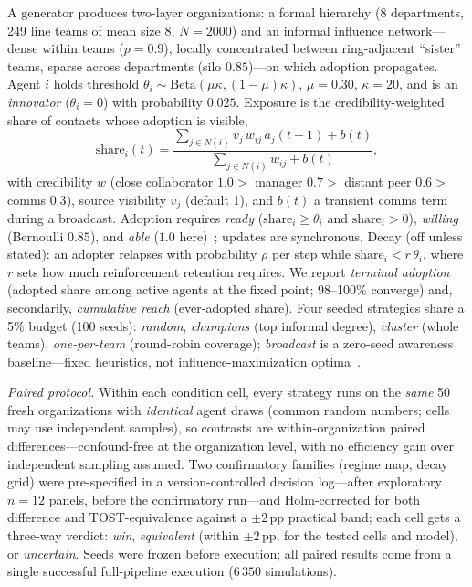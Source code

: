 \documentclass{llncs}
\begin{document}
A generator produces two-layer organizations: a formal hierarchy (8
departments, 249 line teams of mean size 8, $N{=}2000$) and an informal
influence network---dense within teams ($p{=}0.9$), locally concentrated
between ring-adjacent ``sister'' teams, sparse across departments (silo
$0.85$)---on which adoption propagates. Agent $i$ holds threshold
$\theta_i \sim \mathrm{Beta}(\mu\kappa,(1-\mu)\kappa)$, $\mu{=}0.30$,
$\kappa{=}20$, and is an \emph{innovator} ($\theta_i{=}0$) with probability
$0.025$. Exposure is the credibility-weighted share of contacts whose
adoption is visible,
\begin{equation}
\mathrm{share}_i(t) = \frac{\sum_{j\in N(i)} v_j\, w_{ij}\, a_j(t{-}1) + b(t)}
                           {\sum_{j\in N(i)} w_{ij} + b(t)},
\label{eq:share}
\end{equation}
with credibility $w$ (close collaborator $1.0>$ manager $0.7>$ distant peer
$0.6>$ comms $0.3$), source visibility $v_j$ (default 1), and $b(t)$ a
transient comms term during a broadcast. Adoption requires
\emph{ready} ($\mathrm{share}_i\ge\theta_i$ and $\mathrm{share}_i>0$),
\emph{willing} (Bernoulli $0.85$), and \emph{able} ($1.0$
here)~\cite{coale1973}; updates are
synchronous. Decay (off unless stated): an adopter relapses with probability
$\rho$ per step while $\mathrm{share}_i<r\,\theta_i$, where $r$ sets how much
reinforcement retention requires. We report \emph{terminal adoption} (adopted
share among active agents at the fixed point; 98--100\% converge) and,
secondarily, \emph{cumulative reach} (ever-adopted share). Four seeded
strategies share a 5\% budget (100 seeds): \emph{random}, \emph{champions}
(top informal degree), \emph{cluster} (whole teams), \emph{one-per-team}
(round-robin coverage); \emph{broadcast} is a zero-seed awareness
baseline---fixed heuristics, not influence-maximization
optima~\cite{kempe2003,ou2022}.

\emph{Paired protocol.} Within each condition cell, every strategy runs on
the \emph{same} 50 fresh organizations with \emph{identical} agent draws
(common random numbers; cells may use independent samples), so contrasts
are within-organization paired differences---confound-free at the
organization level, with no efficiency gain over independent sampling
assumed. Two confirmatory families (regime map,
decay grid) were pre-specified in a version-controlled decision log---after
exploratory $n{=}12$ panels, before the confirmatory run---and
Holm-corrected for both difference and TOST-equivalence
against a $\pm2$\,pp practical band; each cell gets a three-way verdict:
\emph{win}, \emph{equivalent} (within $\pm2$\,pp, for the tested cells and
model), or \emph{uncertain}. Seeds were frozen before execution; all paired
results come from a single successful full-pipeline execution ($6\,350$
simulations).
\end{document}
